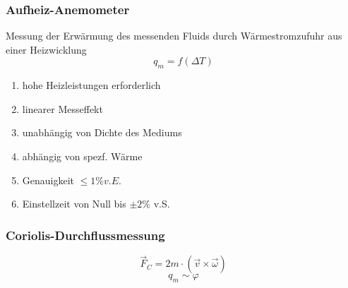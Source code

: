 \documentclass[a4paper]{scrartcl}
\begin{document}
\subsubsection{Aufheiz-Anemometer} Messung der Erwärmung des messenden Fluids durch Wärmestromzufuhr aus einer Heizwicklung
\[ q_m = f (\Delta T)\]
\begin{enumerate}
\item hohe Heizleistungen erforderlich
\item linearer Messeffekt
\item unabhängig von Dichte des Mediums
\item abhängig von spezf. Wärme
\item Genauigkeit $\leq 1 \% v.E.$
\item Einstellzeit von Null bis $\pm 2 \%$ v.S.
\end{enumerate}

\subsubsection{Coriolis-Durchflussmessung}
\[ \vec{F}_C = 2m \cdot (\vec{v} \times \vec{\omega})\]
\[ q_m \sim \varphi \]
\end{document}
